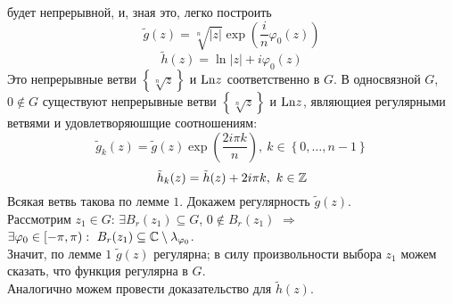 будет непрерывной, и, зная это, легко построить
\begin{equation}\label{(15.10)}
    \tilde{g}(z) = \sqrt[n]{\left| z \right|} \exp\left( \frac{i}{n} \varphi_0(z) \right)
\end{equation}
\begin{equation}\label{(15.11)}
    \tilde{h}(z) = \ln \left| z \right| + i \varphi_0(z)
\end{equation}
Это непрерывные ветви $\left\{ \sqrt[n]{z} \right\}$ и $\mathrm{Ln} z$ соответственно в
$G$.
\theorem
В односвязной $G$, $0 \not \in G$ существуют непрерывные ветви $\left\{
    \sqrt[n]{z} \right\}$ и $\mathrm{Ln} z$, являющиея регулярными ветвями и
удовлетворяюшщие соотношениям:
\begin{equation}\label{(15.12)}
    \tilde{g}_k(z) = \tilde{g}(z)\exp\left( \frac{2i\pi k}{n} \right), \ k \in \left\{ 0, \dots, n-1 \right\}
\end{equation}
\begin{equation}\label{(15.13)}
    \tilde{h}_k(z) = \tilde{h}(z) + 2 i \pi k, \ k \in \mathbb{Z}
\end{equation}
\pr
Всякая ветвь такова по лемме $1$. Докажем регулярность $\tilde{g}(z)$.
\\
Рассмотрим $z_1 \in G$: $\exists B_r(z_1) \subseteq G$, $0 \not \in B_r(z_1)$
$\Rightarrow$ $\exists \varphi_0 \in [-\pi, \pi): \ B_r(z_1) \subseteq \mathbb{C}
\setminus \lambda_{\varphi_0}$.
\\
Значит, по лемме $1$ $\tilde{g}(z)$ регулярна; в силу произвольности выбора
$z_1$ можем сказать, что функция регулярна в $G$.
\\
Аналогично можем провести доказательство для $\tilde{h}(z)$.
